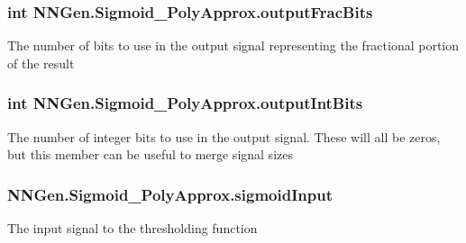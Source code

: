 \subsubsection[{output\+Frac\+Bits}]{\setlength{\rightskip}{0pt plus 5cm}int N\+N\+Gen.\+Sigmoid\+\_\+\+Poly\+Approx.\+output\+Frac\+Bits\hspace{0.3cm}{\ttfamily [get]}}\label{class_n_n_gen_1_1_sigmoid___poly_approx_a3834aa67d528e6f7b4698d651a28d027}


The number of bits to use in the output signal representing the fractional portion of the result 

\hypertarget{class_n_n_gen_1_1_sigmoid___poly_approx_ad9f06e6995afc2b5f049c4d062e6b716}{}
\subsubsection[{output\+Int\+Bits}]{\setlength{\rightskip}{0pt plus 5cm}int N\+N\+Gen.\+Sigmoid\+\_\+\+Poly\+Approx.\+output\+Int\+Bits\hspace{0.3cm}{\ttfamily [get]}}\label{class_n_n_gen_1_1_sigmoid___poly_approx_ad9f06e6995afc2b5f049c4d062e6b716}


The number of integer bits to use in the output signal. These will all be zeros, but this member can be useful to merge signal sizes 

\hypertarget{class_n_n_gen_1_1_sigmoid___poly_approx_ae6da90acd8f62414c3ead1c2cc8538da}{}
\subsubsection[{sigmoid\+Input}]{ N\+N\+Gen.\+Sigmoid\+\_\+\+Poly\+Approx.\+sigmoid\+Input\hspace{0.3cm}{\ttfamily [get]}}\label{class_n_n_gen_1_1_sigmoid___poly_approx_ae6da90acd8f62414c3ead1c2cc8538da}


The input signal to the thresholding function 

\hypertarget{class_n_n_gen_1_1_sigmoid___poly_approx_a93bf10c040a0ed7dd4428c9df4539188}{}
